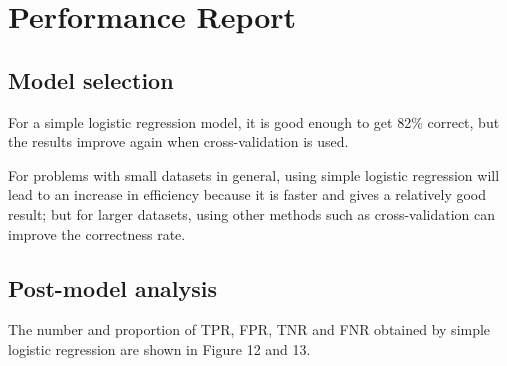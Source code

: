\documentclass{article}
\begin{document}
\begin{figure}[htbp]
\centering

%
%

\centering
\end{figure}




\section{Performance Report}

\subsection{Model selection}
For a simple logistic regression model, it is good enough to get 82\% correct, but the results improve again when cross-validation is used.

For problems with small datasets in general, using simple logistic regression will lead to an increase in efficiency because it is faster and gives a relatively good result; but for larger datasets, using other methods such as cross-validation can improve the correctness rate.

\subsection{Post-model analysis}
The number and proportion of TPR, FPR, TNR and FNR obtained by simple logistic regression are shown in Figure 12 and 13.
\end{document}

